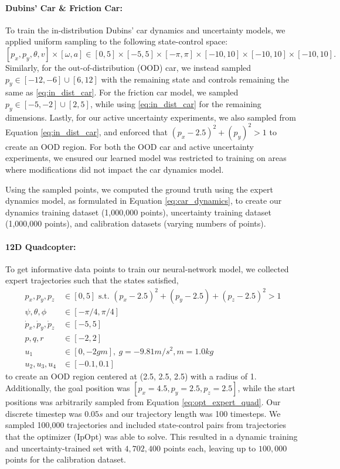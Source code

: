 \documentclass{l4dc2026}
\begin{document}
\paragraph{Dubins' Car \& Friction Car:} To train the in-distribution Dubins' car dynamics and uncertainty models, we applied uniform sampling to the following state-control space:
\begin{equation}\label{eq:in_dist_car}[p_x, p_y, \theta, v] \times[\omega, a]\in [0, 5] \times [-5, 5] \times [-\pi, \pi] \times [-10, 10] \times [-10, 10] \times [-10, 10]. \end{equation}
Similarly, for the out-of-distribution (OOD) car, we instead sampled $p_y \in [-12, -6] \cup [6,12]$ with the remaining state and controls remaining the same as \eqref{eq:in_dist_car}. For the friction car model, we sampled $p_y \in [-5, -2] \cup [2,5]$, while using \eqref{eq:in_dist_car} for the remaining dimensions. Lastly, for our active uncertainty experiments, we also sampled from Equation \ref{eq:in_dist_car}, and enforced that $(p_x - 2.5)^2 + (p_y)^2 > 1$ to create an OOD region. For both the OOD car and active uncertainty experiments, we ensured our learned model was restricted to training on areas where modifications did not impact the car dynamics model. 

Using the sampled points, we computed the ground truth using the expert dynamics model, as formulated in Equation \ref{eq:car_dynamics}, to create our dynamics training dataset (1,000,000 points), uncertainty training dataset (1,000,000 points), and calibration datasets (varying numbers of points).

\paragraph{12D Quadcopter:} To get informative data points to train our neural-network model, we collected expert trajectories such that the states satisfied,
\begin{subequations}\label{eq:opt_expert_quad}
\begin{align}
p_x, p_y, p_z &\in [0,5]\text{ s.t. } (p_x-2.5)^2 + (p_y-2.5) + (p_z-2.5)^2 > 1 \\
    \psi, \theta, \phi &\in [-\pi/4, \pi/4]\\
\dot{p}_x, \dot{p}_y, \dot{p}_z  &\in [-5, 5]\\
p,q,r &\in [-2, 2]\\
u_1 &\in [0, -2gm],~g = -9.81 m/{s^2}, m=1.0 kg \\
u_2, u_3, u_4 &\in [-0.1, 0.1]
\end{align}   
\end{subequations}
to create an OOD region centered at (2.5, 2.5, 2.5) with a radius of 1. Additionally, the goal position was $[p_x = 4.5, p_y = 2.5, p_z = 2.5]$, while the start positions was arbitrarily sampled from Equation \ref{eq:opt_expert_quad}. Our discrete timestep was $0.05s$ and our trajectory length was 100 timesteps. We sampled 100,000 trajectories and included state-control pairs from trajectories that the optimizer (IpOpt) was able to solve. This resulted in a dynamic training and uncertainty-trained set with $4,702,400$ points each, leaving up to $100,000$ points for the calibration dataset.
\end{document}
